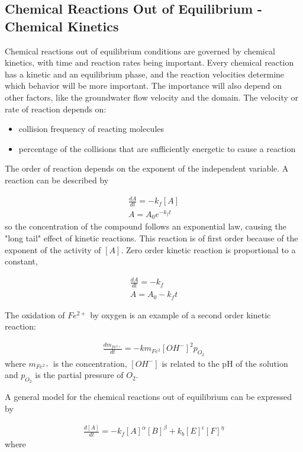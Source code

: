 \documentclass[11pt,twoside]{report}
\begin{document}
\subsection{Chemical Reactions Out of Equilibrium - Chemical Kinetics}\label{seckin}
Chemical reactions out of equilibrium conditions are governed by chemical kinetics, with time and reaction rates being important. Every chemical reaction has a kinetic and an equilibrium phase, and the reaction velocities determine which behavior will be more important. The importance will also depend on other factors, like the groundwater flow velocity and the domain. The velocity or rate of reaction depends on:

\begin{itemize}
   \item collision frequency of reacting molecules
   \item percentage of the collisions that are sufficiently energetic to cause a reaction
\end{itemize}

The order of reaction depends on the exponent of the independent variable. A reaction can be described by

\begin{align}
   \frac{dA}{dt} = -k_{f}[A] \\
   A = A_{0}e^{-k_{f}t}
\end{align}
so the concentration of the compound follows an exponential law, causing the "long tail" effect of kinetic reactions. This reaction is of first order because of the exponent of the activity of $[A]$. Zero order kinetic reaction is proportional to a constant, 

\begin{align}
   \frac{dA}{dt} = -k_{f} \\
   A = A_{0} - k_{f}t
\end{align}

The oxidation of $Fe^{2+}$ by oxygen is an example of a second order kinetic reaction:

\begin{align}
   \frac{dm_{Fe^{2+}}}{dt} = -k m_{Fe^{2}}[OH^{-}]^{2}p_{O_{2}}
\end{align}
where $m_{Fe^{2+}}$ is the concentration, $[OH^{-}]$ is related to the pH of the solution and $p_{O_{2}}$ is the partial pressure of $O_{2}$.

A general model for the chemical reactions out of equilibrium can be expressed by

\begin{align}
   \frac{d[A]}{dt} = -k_{f}[A]^{\alpha}[B]^{\beta} + k_{b}[E]^{\epsilon}[F]^{\eta}
\end{align}
where
\end{document}
